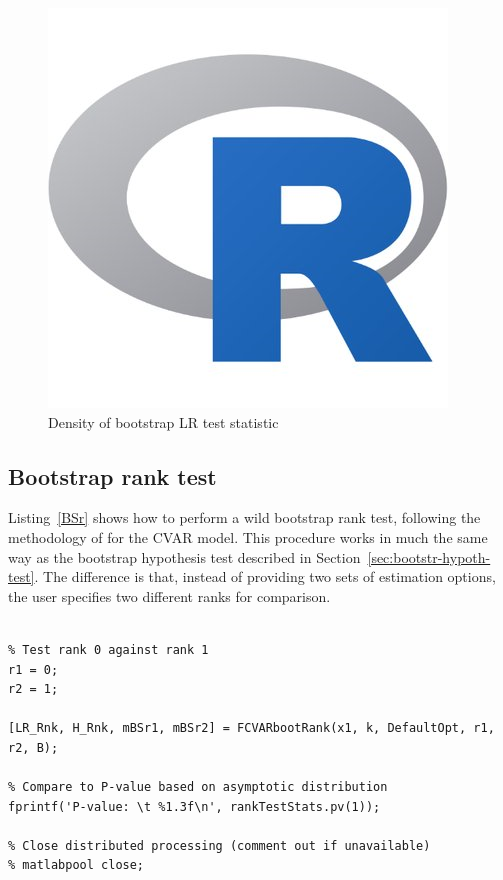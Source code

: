 \documentclass[10pt]{article}
\begin{document}
\begin{figure}[tbh]
  \centering
  \caption{Density of bootstrap LR test statistic}
  \label{fig:BS}
  \includegraphics[scale = 1, keepaspectratio=true]{LRdensity_bw045.png}
\end{figure}


\subsection{Bootstrap rank test}
\label{sec:bootstrap-rank-test}

Listing~\ref{BSr} shows how to perform a wild bootstrap rank test, following the methodology of \cite{Cavaliere2010} for the CVAR model. This procedure works in much the same way as the bootstrap hypothesis test described in Section~\ref{sec:bootstr-hypoth-test}. The difference is that, instead of providing two sets of estimation options, the user specifies two different ranks for comparison.

\begin{lstlisting}[frame=single,caption={Bootstrap rank test}, label = BSr]
%% --------- BOOTSTRAP RANK TEST ---------- %

% Test rank 0 against rank 1
r1 = 0;
r2 = 1;

[LR_Rnk, H_Rnk, mBSr1, mBSr2] = FCVARbootRank(x1, k, DefaultOpt, r1, r2, B);

% Compare to P-value based on asymptotic distribution
fprintf('P-value: \t %1.3f\n', rankTestStats.pv(1));

% Close distributed processing (comment out if unavailable)
% matlabpool close;
\end{lstlisting}
\end{document}
